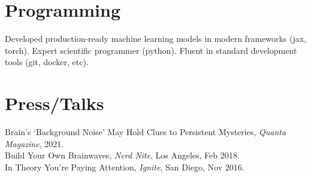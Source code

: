 \documentclass[margin,line]{res}
\begin{document}
\begin{resume}
\vspace{-.8cm}
\section{\sc Programming} Developed production-ready machine learning models in modern frameworks (jax, torch). Expert scientific programmer (python). Fluent in standard development tools (git, docker, etc).

\vspace{-.35cm}
\section{\sc Press/Talks}
Brain's `Background Noise' May Hold Clues to Persistent Mysteries, \emph{Quanta Magazine}, 2021. \\
Build Your Own Brainwaves, \emph{Nerd Nite}, Los Angeles, Feb 2018. \\
In Theory You're Paying Attention, \emph{Ignite}, San Diego, Nov 2016. \\
    
\vspace{-.4cm} 

\end{resume}
\end{document}
